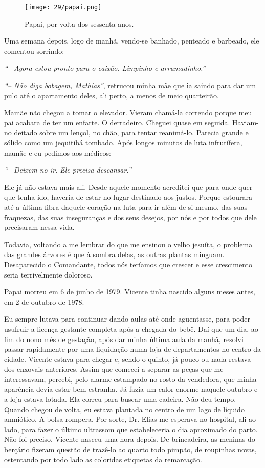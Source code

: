 \begin{figure}
\centering
\texttt{[image: 29/papai.png]}
\caption{Papai, por volta dos sessenta anos.}
\end{figure}

Uma semana depois, logo de manhã, vendo-se banhado, penteado e barbeado, ele comentou sorrindo:

\textit{``-- Agora estou pronto para o caixão.
Limpinho e arrumadinho.''}

\textit{``-- Não diga bobagem, Mathias''}, retrucou minha mãe que ia saindo para dar um pulo até o apartamento deles, ali perto, a menos de meio quarteirão.

Mamãe não chegou a tomar o elevador.
Vieram chamá-la correndo porque meu pai acabara de ter um enfarte.
O derradeiro.
Cheguei quase em seguida.
Haviam-no deitado sobre um lençol, no chão, para tentar reanimá-lo.
Parecia grande e sólido como um jequitibá tombado.
Após longos minutos de luta infrutífera, mamãe e eu pedimos aos médicos: 

\textit{``-- Deixem-no ir.
Ele precisa descansar.''}

Ele já não estava mais ali.
Desde aquele momento acreditei que para onde quer que tenha ido, haveria de estar no lugar destinado aos justos.
Porque estourara até a última fibra daquele coração na luta para ir além de si mesmo, das suas fraquezas, das suas inseguranças e dos seus desejos, por nós e por todos que dele precisaram nessa vida.

Todavia, voltando a me lembrar do que me ensinou o velho jesuíta, o problema das grandes árvores é que à sombra delas, as outras plantas minguam.
Desaparecido o Comandante, todos nós teríamos que crescer e esse crescimento seria terrivelmente doloroso.

Papai morreu em 6 de junho de 1979.
Vicente tinha nascido alguns meses antes, em 2 de outubro de 1978.

Eu sempre lutava para continuar dando aulas até onde aguentasse, para poder usufruir a licença gestante completa após a chegada do bebê.
Daí que um dia, ao fim do nono mês de gestação, após dar minha última aula da manhã, resolvi passar rapidamente por uma liquidação numa loja de departamentos no centro da cidade.
Vicente estava para chegar e, sendo o quinto, já pouco ou nada restava dos enxovais anteriores.
Assim que comecei a separar as peças que me interessavam, percebi, pelo alarme estampado no rosto da vendedora, que minha aparência devia estar bem estranha.
Já fazia um calor enorme naquele outubro e a loja estava lotada.
Ela correu para buscar uma cadeira.
Não deu tempo.
Quando chegou de volta, eu estava plantada no centro de um lago de líquido amniótico.
A bolsa rompera.
Por sorte, Dr. Elias me esperava no hospital, ali ao lado, para fazer o último ultrassom que estabeleceria o dia aproximado do parto.
Não foi preciso.
Vicente nasceu uma hora depois.
De brincadeira, as meninas do berçário fizeram questão de trazê-lo ao quarto todo pimpão, de roupinhas novas, ostentando por todo lado as coloridas etiquetas da remarcação.


